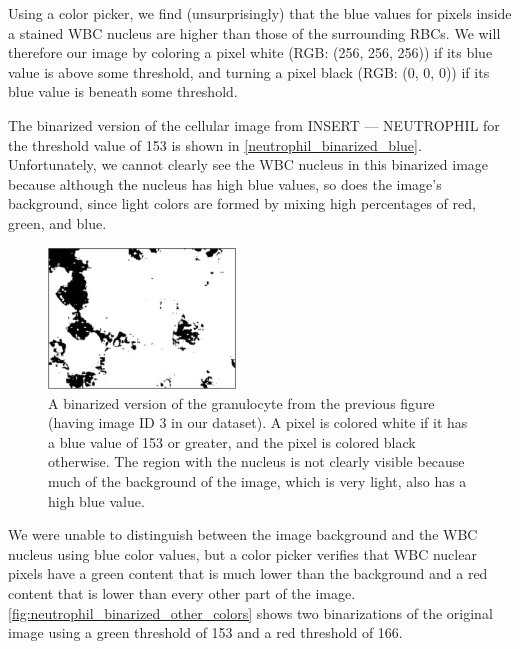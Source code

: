 Using a color picker, we find (unsurprisingly) that the blue values for pixels inside a stained WBC nucleus are higher than those of the surrounding RBCs. We will therefore  our image by coloring a pixel white (RGB: (256, 256, 256)) if its blue value is above some threshold, and turning a pixel black (RGB: (0, 0, 0)) if its blue value is beneath some threshold.

The binarized version of the cellular image from INSERT --- NEUTROPHIL for the threshold value of 153 is shown in \autoref{neutrophil_binarized_blue}. Unfortunately, we cannot clearly see the WBC nucleus in this binarized image because although the nucleus has high blue values, so does the image's background, since light colors are formed by mixing high percentages of red, green, and blue.

\begin{figure}[p]
\centering
\mySfFamily
\includegraphics[width = 0.444\textwidth]{../images/neutrophil_binarized_blue.png}
\caption{A binarized version of the granulocyte from the previous figure (having image ID 3 in our dataset). A pixel is colored white if it has a blue value of 153 or greater, and the pixel is colored black otherwise. The region with the nucleus is not clearly visible because much of the background of the image, which is very light, also has a high blue value.}
\label{fig:neutrophil_binarized_blue}
\end{figure}

\begin{qbox}\end{qbox}


We were unable to distinguish between the image background and the WBC nucleus using blue color values, but a color picker verifies that WBC nuclear pixels have a green content that is much lower than the background and a red content that is lower than every other part of the image. \autoref{fig:neutrophil_binarized_other_colors} shows two binarizations of the original image using a green threshold of 153 and a red threshold of 166.


